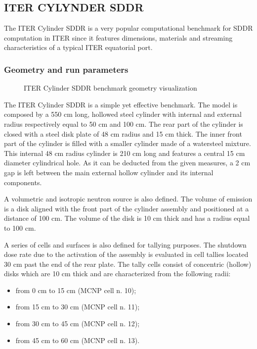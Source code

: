 \documentclass[letterpaper,10pt,english]{sphinxmanual}
\let\sphinxpxdimen\pdfpxdimen\else\newdimen\sphinxpxdimen
\begin{document}
\subsection{ITER CYLYNDER SDDR}
\label{\detokenize{usage/benchmarks:iter-cylynder-sddr}}
\sphinxAtStartPar
The ITER Cylinder SDDR is a very popular computational benchmark for
SDDR computation in ITER since it features dimensions, materials and
streaming characteristics of a typical ITER equatorial port.


\subsubsection{Geometry and run parameters}
\label{\detokenize{usage/benchmarks:id9}}
\begin{figure}[htbp]
\centering
\capstart

\noindent\sphinxincludegraphics[width=600\sphinxpxdimen]{{cylSDDR}.png}
\caption{ITER Cylinder SDDR benchmark geometry visualization}\label{\detokenize{usage/benchmarks:id28}}\end{figure}

\sphinxAtStartPar
The ITER Cylinder SDDR is a simple yet effective benchmark. The model
is composed by a 550 cm long, hollowed steel cylinder with internal and
external radius respectively equal to 50 cm and 100 cm. The rear part of
the cylinder is closed with a steel disk plate of 48 cm radius and 15 cm thick.
The inner front part of the cylinder is filled with a smaller cylinder made
of a water\sphinxhyphen{}steel mixture. This internal 48 cm radius cylinder is 210 cm long
and features a central 15 cm diameter cylindrical hole. As it can be deducted
from the given measures, a 2 cm gap is left between the main external hollow
cylinder and its internal components.

\sphinxAtStartPar
A volumetric and isotropic neutron source is also defined. The volume of
emission is a disk aligned with the front part of the cylinder assembly and
positioned at a distance of 100 cm. The volume of the disk is 10 cm thick and
has a radius equal to 100 cm.

\sphinxAtStartPar
A series of cells and surfaces is also defined for tallying purposes.
The shutdown dose rate due to the activation of the assembly is evaluated in cell
tallies located 30 cm past the end of the rear plate. The tally cells consist of
concentric (hollow) disks which are 10 cm thick and are characterized from the
following radii:
\begin{itemize}
\item {} 
\sphinxAtStartPar
from 0 cm to 15 cm (MCNP cell n. 10);

\item {} 
\sphinxAtStartPar
from 15 cm to 30 cm (MCNP cell n. 11);

\item {} 
\sphinxAtStartPar
from 30 cm to 45 cm (MCNP cell n. 12);

\item {} 
\sphinxAtStartPar
from 45 cm to 60 cm (MCNP cell n. 13).

\end{itemize}
\end{document}
